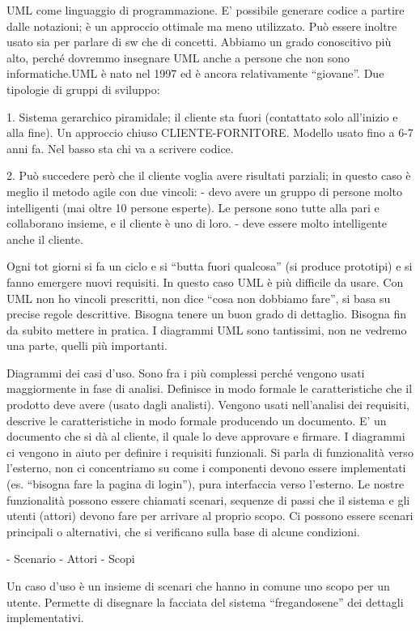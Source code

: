 UML come linguaggio di programmazione. E' possibile generare codice a partire dalle notazioni; è un approccio ottimale ma meno utilizzato. Può essere inoltre usato sia per parlare di sw che di concetti. Abbiamo un grado conoscitivo più alto, perché dovremmo insegnare UML anche a persone che non sono informatiche.UML è nato nel 1997 ed è ancora relativamente “giovane”. Due tipologie di gruppi di sviluppo: 

1. Sistema gerarchico piramidale; il cliente sta fuori (contattato solo all'inizio e alla fine). Un approccio chiuso CLIENTE-FORNITORE. Modello usato fino a 6-7 anni fa. Nel basso sta chi va a scrivere codice.

2. Può succedere però che il cliente voglia avere risultati parziali; in questo caso è meglio il metodo agile con due vincoli:
- devo avere un gruppo di persone molto intelligenti (mai oltre 10 persone esperte). Le persone sono tutte alla pari e collaborano insieme, e il cliente è uno di loro.
- deve essere molto intelligente anche il cliente.

Ogni tot giorni si fa un ciclo e si “butta fuori qualcosa” (si produce prototipi) e si fanno emergere 
nuovi requisiti. In questo caso UML è più difficile da usare. Con UML non ho vincoli prescritti, non dice “cosa non dobbiamo fare”, si basa su precise regole descrittive. Bisogna tenere un buon grado di dettaglio. Bisogna fin da subito mettere in pratica. I diagrammi UML sono tantissimi, non ne vedremo una parte, quelli più importanti.

Diagrammi dei casi d'uso. Sono fra i più complessi perché vengono usati maggiormente in fase di analisi. Definisce in modo 
formale le caratteristiche che il prodotto deve avere (usato dagli analisti). Vengono usati nell'analisi dei requisiti, descrive le caratteristiche in modo formale producendo un documento. E' un documento che si dà al cliente, il quale lo deve approvare e firmare. I diagrammi ci vengono in aiuto per definire i requisiti funzionali. Si parla di funzionalità verso l'esterno, non ci concentriamo su come i componenti devono essere implementati (es. “bisogna fare la pagina di login”), pura interfaccia verso l'esterno. Le nostre funzionalità possono essere chiamati scenari, sequenze di passi che il sistema e gli utenti (attori) devono fare per arrivare al proprio scopo. Ci possono essere scenari principali o alternativi, che si verificano sulla base di alcune condizioni.

- Scenario
- Attori
- Scopi

Un caso d'uso è un insieme di scenari che hanno in comune uno scopo per un utente. Permette di disegnare la facciata del sistema “fregandosene” dei dettagli implementativi. 

